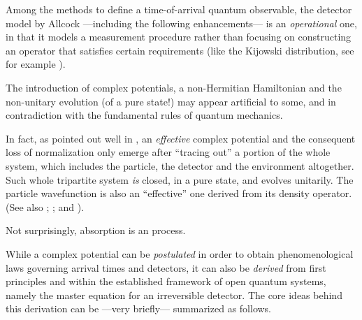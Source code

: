 Among the methods to define a time-of-arrival quantum observable,
the detector model by Allcock
---including the following enhancements---
is an \emph{operational} one,
in that it models a measurement procedure \parencite[sec.9]{Leavens_TOA}
rather than focusing on constructing an operator that satisfies certain requirements
(like the Kijowski distribution, see for example \cite[sec.8]{Leavens_TOA}).

The introduction of complex potentials, a non-Hermitian Hamiltonian and
the non-unitary evolution (of a pure state!) may appear artificial to some,
and in contradiction with the fundamental rules of quantum mechanics.

\citereset
In fact, as pointed out well in \cite{Halliwell_Irreversible},
an \emph{effective} complex potential and the consequent loss of normalization
only emerge after ``tracing out'' a portion of the whole system,
which includes the particle, the detector and the environment altogether.
Such whole tripartite system \emph{is} closed, in a pure state, and evolves unitarily.
The particle wavefunction is also an ``effective'' one derived from its density operator.
(See also
  \cite{Wave-function_approach, Hegerfeldt_WignerSymposium, TheQuantumJumpApproach};
  \cite{TQM2:Jump};
and
  \cite[sec.6.7.1 ``Simulating Quantum Trajectories'']{WallsMilburn}).

Not surprisingly, absorption is an  process.

While a complex potential can be \emph{postulated} in order to obtain
phenomenological laws governing arrival times and detectors,
it can also be \emph{derived} from first principles and within the established framework
of open quantum systems, namely the master equation
for an irreversible detector.
The core ideas behind this derivation
can be ---very briefly--- summarized as follows.

